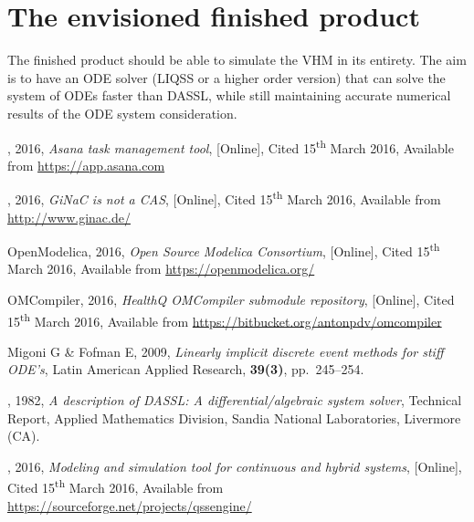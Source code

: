 \documentclass[10pt]{article}
\begin{document}
\section{The envisioned finished product}

The finished product should be able to simulate the VHM in its entirety. The aim is to have an ODE solver (LIQSS or a higher order version) that can solve the system of ODEs faster than DASSL, while still maintaining accurate numerical results of the ODE system consideration.


{\footnotesize
\begin{thebibliography}{10}

, 2016, {\em Asana task management tool}, [Online], Cited 15\textsuperscript{th} March 2016, Available from {\url{https://app.asana.com}}

, 2016, {\em GiNaC is not a CAS}, [Online], Cited 15\textsuperscript{th} March 2016, Available from {\url{http://www.ginac.de/}}

 {\sc OpenModelica}, 2016, {\em Open Source Modelica Consortium}, [Online], Cited 15\textsuperscript{th} March 2016, Available from {\url{https://openmodelica.org/}}

 {\sc OMCompiler}, 2016, {\em HealthQ OMCompiler submodule repository}, [Online], Cited 15\textsuperscript{th} March 2016, Available from {\url{https://bitbucket.org/antonpdv/omcompiler}}

 {\sc Migoni G \& Fofman E}, 2009, {\em Linearly implicit discrete event methods for stiff ODE's}, Latin American Applied Research, {\bf{39(3)}}, pp.\, 245--254.

, 1982, {\em A description of DASSL: A differential/algebraic system solver}, Technical Report, Applied Mathematics Division, Sandia National Laboratories, Livermore (CA).

, 2016, {\em Modeling and simulation tool for continuous and hybrid systems}, [Online], Cited 15\textsuperscript{th} March 2016, Available from {\url{https://sourceforge.net/projects/qssengine/}}




\end{thebibliography}}
\end{document}
